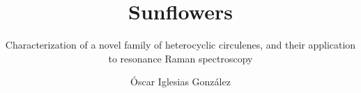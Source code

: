 \documentclass[
	fontsize=10pt, %
	twoside=true, %
	numbers=noenddot, %
]{kaobook}
\begin{document}




\titlehead{Sunflowers}

\title[Sunflowers]{Sunflowers}
\subtitle{Characterization of a novel family of heterocyclic circulenes, and their application to resonance Raman spectroscopy}

\author[oscarigrexas]{Óscar Iglesias González}



\frontmatter %




%
%
%
%
%
%
%
%
\end{document}
